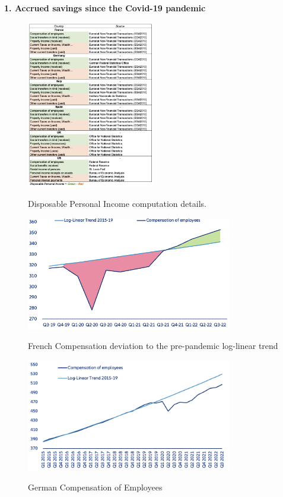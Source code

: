 \large{\textbf{1. Accrued savings since the Covid-19 pandemic}}

\begin{figure}[H]
    \centering
    \caption{Disposable Personal Income computation details. }
    \includegraphics[width=0.5\textwidth]{Core/1.Savings/img/Ax_savings_table.png}
    \label{figure:DPI_table}
\end{figure}

\begin{figure}[H]
    \centering
    \caption{French Compensation deviation to the pre-pandemic log-linear trend}
    \includegraphics[width=0.8\textwidth]{Core/1.Savings/img/Ax_fr_compensation.png}
    \label{figure:fr_compensation}
\end{figure}

\begin{figure}[H]
    \centering
    \caption{German Compensation of Employees}
    \includegraphics[width=0.8\textwidth]{Core/1.Savings/img/Ax_ger_compensation.png}
    \label{figure:ger_compensation}
\end{figure}

